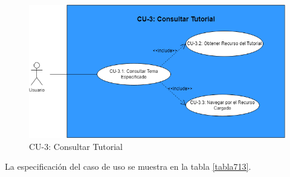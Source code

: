   \begin{figure}[H]
       \begin{center} 
 	\includegraphics[scale=0.55]{figuras/Cap7/CU3.png}
 	\caption{CU-3: Consultar Tutorial}
 	\label{fig:CU3}
       \end{center}
   \end{figure}

 La especificación del caso de uso se muestra en la tabla \ref{tabla713}.


